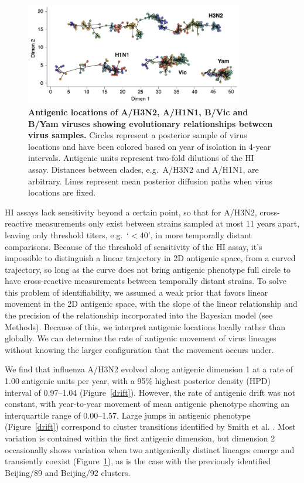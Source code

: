 \documentclass[11pt,oneside,letterpaper]{article}
\begin{document}
\begin{figure}[h]
	\centering		
	\includegraphics[width=0.85\textwidth]{figures/map}
	\caption{\textbf{Antigenic locations of A/H3N2, A/H1N1, B/Vic and B/Yam viruses showing evolutionary relationships between virus samples.} 
	Circles represent a posterior sample of virus locations and have been colored based on year of isolation in 4-year intervals.
	Antigenic units represent two-fold dilutions of the HI assay.
	Distances between clades, e.g.\ A/H3N2 and A/H1N1, are arbitrary.
	Lines represent mean posterior diffusion paths when virus locations are fixed.} 
	\label{map} 
\end{figure}

HI assays lack sensitivity beyond a certain point, so that for A/H3N2, cross-reactive measurements only exist between strains sampled at most 11 years apart, leaving only threshold titers, e.g.\ `$<$40', in more temporally distant comparisons.  
Because of the threshold of sensitivity of the HI assay, it's impossible to distinguish a linear trajectory in 2D antigenic space, from a curved trajectory, so long as the curve does not bring antigenic phenotype full circle to have cross-reactive measurements between temporally distant strains.
To solve this problem of identifiability, we assumed a weak prior that favors linear movement in the 2D antigenic space, with the slope of the linear relationship and the precision of the relationship incorporated into the Bayesian model (see Methods).
Because of this, we interpret antigenic locations locally rather than globally.
We can determine the rate of antigenic movement of virus lineages without knowing the larger configuration that the movement occurs under.
 
We find that influenza A/H3N2 evolved along antigenic dimension 1 at a rate of 1.00 antigenic units per year, with a 95\% highest posterior density (HPD) interval of 0.97--1.04 (Figure~\ref{drift}).
However, the rate of antigenic drift was not constant, with year-to-year movement of mean antigenic phenotype showing an interquartile range of 0.00--1.57.  
Large jumps in antigenic phenotype (Figure~\ref{drift}) correspond to cluster transitions identified by Smith et al. \cite{Smith04}.  
Most variation is contained within the first antigenic dimension, but dimension 2 occasionally shows variation when two antigenically distinct lineages emerge and transiently coexist (Figure~\ref{map}), as is the case with the previously identified Beijing/89 and Beijing/92 clusters.
\end{document}
